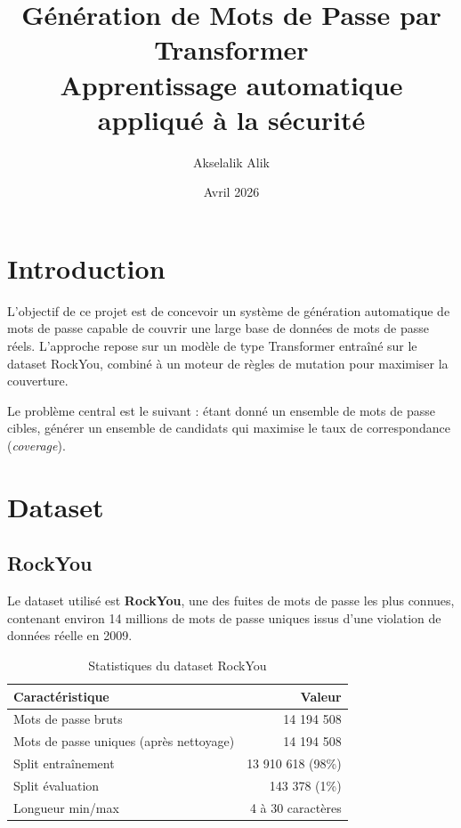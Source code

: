 \documentclass[12pt,a4paper]{article}
\title{\textbf{Génération de Mots de Passe par Transformer}\\
\large Apprentissage automatique appliqué à la sécurité}
\author{Akselalik Alik}
\date{Avril 2026}
\begin{document}
\maketitle
\tableofcontents
\newpage

\section{Introduction}

L'objectif de ce projet est de concevoir un système de génération automatique de mots de passe capable de couvrir une large base de données de mots de passe réels. L'approche repose sur un modèle de type Transformer entraîné sur le dataset RockYou, combiné à un moteur de règles de mutation pour maximiser la couverture.

Le problème central est le suivant : étant donné un ensemble de mots de passe cibles, générer un ensemble de candidats qui maximise le taux de correspondance (\textit{coverage}).

\section{Dataset}

\subsection{RockYou}

Le dataset utilisé est \textbf{RockYou}, une des fuites de mots de passe les plus connues, contenant environ 14 millions de mots de passe uniques issus d'une violation de données réelle en 2009.

\begin{table}[H]
\centering
\begin{tabular}{lr}
\toprule
\textbf{Caractéristique} & \textbf{Valeur} \\
\midrule
Mots de passe bruts & 14 194 508 \\
Mots de passe uniques (après nettoyage) & 14 194 508 \\
Split entraînement & 13 910 618 (98\%) \\
Split évaluation & 143 378 (1\%) \\
Longueur min/max & 4 à 30 caractères \\
\bottomrule
\end{tabular}
\caption{Statistiques du dataset RockYou}
\end{table}
\end{document}
